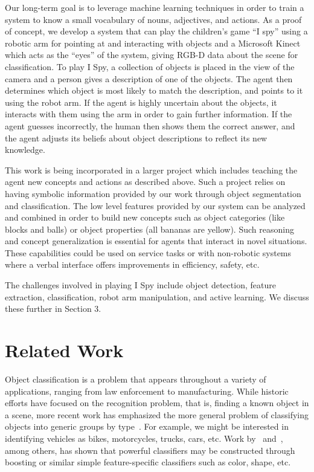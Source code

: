 \documentclass[11pt]{article}
\newcommand{\xxx}[1]{{\bf \color{red} #1}}
\begin{document}
Our long-term goal is to leverage machine learning techniques in order to train
a system to know a small vocabulary of nouns, adjectives, and actions. As a proof
of concept, we develop a system that can play the children's game ``I spy'' using
a robotic arm for pointing at and interacting with objects and a Microsoft Kinect
which acts as the ``eyes'' of the system, giving RGB-D data about the scene for
classification. To play I Spy, a collection of objects is placed in the view
of the camera and a person gives a description of one of the objects. The agent
then determines which object is most likely to match the description, and points
to it using the robot arm. If the agent is highly uncertain about the objects, it
interacts with them using the arm in order to gain further information. If the
agent guesses incorrectly, the human then shows them the correct answer, and
the agent adjusts its beliefs about object descriptions to reflect its new
knowledge.

This work is being incorporated in a larger project which includes teaching the
agent new concepts and actions as described above. Such a project relies on having
symbolic information provided by our work through object segmentation and
classification. The low level features provided by our system can be analyzed and
combined in order to build new concepts such as object categories (like blocks
and balls) or object properties (all bananas are yellow). Such reasoning and
concept generalization is essential for agents that interact in novel situations.
These capabilities could be used on service tasks or with non-robotic systems
where a verbal interface offers improvements in efficiency, safety, etc.

The challenges involved in playing I Spy include object detection, feature
extraction, classification, robot arm manipulation, and active learning. We
discuss these further in Section 3.

\section{Related Work}

Object classification is a problem that appears throughout a variety of
applications, ranging from law enforcement to manufacturing. While historic
efforts have focused on the recognition problem, that is, finding a known object
in a scene, more recent work has emphasized the more general problem of
classifying objects into generic groups by type~\cite{huber2004parts}. For example,
we might be interested in identifying vehicles as bikes, motorcycles, trucks,
cars, etc. Work by~\cite{nilsback2006visual} and~\cite{gehler2009feature}, among
others, has shown that powerful classifiers may be constructed through boosting
or similar simple feature-specific classifiers such as color, shape, etc.
\end{document}
